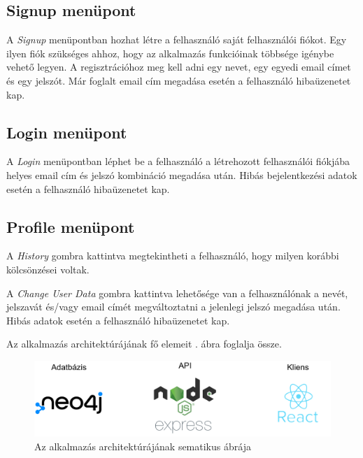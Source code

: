 \subsection{Signup menüpont}

A \textit{Signup} menüpontban hozhat létre a felhasználó saját felhasználói fiókot. Egy ilyen fiók szükséges ahhoz, hogy az alkalmazás funkcióinak többsége igénybe vehető legyen. A regisztrációhoz meg kell adni egy nevet, egy egyedi email címet és egy jelszót. Már foglalt email cím megadása esetén a felhasználó hibaüzenetet kap.

\subsection{Login menüpont}

A \textit{Login} menüpontban léphet be a felhasználó a létrehozott felhasználói fiókjába helyes email cím és jelszó kombináció megadása után. Hibás bejelentkezési adatok esetén a felhasználó hibaüzenetet kap.

\subsection{Profile menüpont}

A \textit{History} gombra kattintva megtekintheti a felhasználó, hogy milyen korábbi kölcsönzései voltak.

A \textit{Change User Data} gombra kattintva lehetősége van a felhasználónak a nevét, jelszavát és/vagy email címét megváltoztatni a jelenlegi jelszó megadása után. Hibás adatok esetén a felhasználó hibaüzenetet kap.


Az alkalmazás architektúrájának fő elemeit . ábra foglalja össze.

\begin{figure}[h]
   \centering
   \includegraphics[scale=0.3]{images/graphlibrary_architecture.png}
   \caption{Az alkalmazás architektúrájának sematikus ábrája}
   \label{fig:graphlibrary_architecture}
\end{figure}

